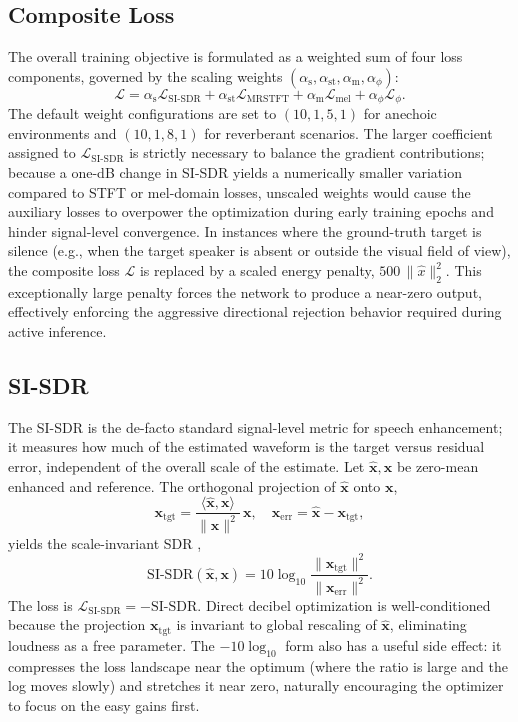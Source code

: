 \documentclass[journal,10pt]{IEEEtran}
\newcommand{\bx}{\mathbf{x}}
\newcommand{\Lcal}{\mathcal{L}}
\begin{document}
\subsection{Composite Loss}
The overall training objective is formulated as a weighted sum of four loss components, governed by the scaling weights \((\alpha_{\mathrm{s}}, \alpha_{\mathrm{st}}, \alpha_{\mathrm{m}}, \alpha_{\phi})\):
\begin{equation}
\Lcal = \alpha_{\mathrm{s}}\Lcal_{\mathrm{SI\text{-}SDR}} + \alpha_{\mathrm{st}}\Lcal_{\mathrm{MRSTFT}} + \alpha_{\mathrm{m}}\Lcal_{\mathrm{mel}} + \alpha_{\phi}\Lcal_{\phi}.
\label{eq:totloss}
\end{equation}
The default weight configurations are set to \((10, 1, 5, 1)\) for anechoic environments and \((10, 1, 8, 1)\) for reverberant scenarios. The larger coefficient assigned to \(\Lcal_{\mathrm{SI\text{-}SDR}}\) is strictly necessary to balance the gradient contributions; because a one-dB change in SI-SDR yields a numerically smaller variation compared to STFT or mel-domain losses, unscaled weights would cause the auxiliary losses to overpower the optimization during early training epochs and hinder signal-level convergence. In instances where the ground-truth target is silence (e.g., when the target speaker is absent or outside the visual field of view), the composite loss \(\Lcal\) is replaced by a scaled energy penalty, \(500\,\|\hat{x}\|_2^2\). This exceptionally large penalty forces the network to produce a near-zero output, effectively enforcing the aggressive directional rejection behavior required during active inference.

\subsection{SI-SDR}
The SI-SDR \cite{leroux2019sdr} is the de-facto standard signal-level metric for speech enhancement; it measures how much of the estimated waveform is the target versus residual error, independent of the overall scale of the estimate. Let \(\hat{\bx},\bx\) be zero-mean enhanced and reference. The orthogonal projection of \(\hat{\bx}\) onto \(\bx\),
\begin{equation}
\bx_{\mathrm{tgt}}=\frac{\langle\hat{\bx},\bx\rangle}{\|\bx\|^2}\,\bx,\quad \bx_{\mathrm{err}}=\hat{\bx}-\bx_{\mathrm{tgt}},
\end{equation}
yields the scale-invariant SDR \cite{leroux2019sdr},
\begin{equation}
\mathrm{SI\text{-}SDR}(\hat{\bx},\bx)=10\log_{10}\!\frac{\|\bx_{\mathrm{tgt}}\|^2}{\|\bx_{\mathrm{err}}\|^2}.
\end{equation}
The loss is \(\Lcal_{\mathrm{SI\text{-}SDR}}=-\mathrm{SI\text{-}SDR}\). Direct decibel optimization is well-conditioned because the projection \(\bx_{\mathrm{tgt}}\) is invariant to global rescaling of \(\hat{\bx}\), eliminating loudness as a free parameter. The \(-10\log_{10}\) form also has a useful side effect: it compresses the loss landscape near the optimum (where the ratio is large and the log moves slowly) and stretches it near zero, naturally encouraging the optimizer to focus on the easy gains first.
\end{document}
